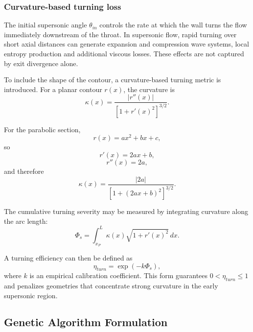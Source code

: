 \documentclass[journal,article,submit,oneauthor]{Definitions/mdpi}
\begin{document}
\subsubsection{Curvature-based turning loss}

The initial supersonic angle $\theta_{in}$ controls the rate at which the wall turns the flow immediately downstream of the throat. In supersonic flow, rapid turning over short axial distances can generate expansion and compression wave systems, local entropy production and additional viscous losses. These effects are not captured by exit divergence alone.

To include the shape of the contour, a curvature-based turning metric is introduced. For a planar contour $r(x)$, the curvature is
\begin{equation}
\kappa(x)=\frac{|r''(x)|}{\left[1+r'(x)^2\right]^{3/2}}.
\label{eq:curvature_general}
\end{equation}

For the parabolic section,
\begin{equation}
r(x)=ax^2+bx+c,
\end{equation}
so
\begin{equation}
r'(x)=2ax+b,
\end{equation}
\begin{equation}
r''(x)=2a,
\end{equation}
and therefore
\begin{equation}
\kappa(x)=\frac{|2a|}{\left[1+(2ax+b)^2\right]^{3/2}}.
\label{eq:curvature_parabola}
\end{equation}

The cumulative turning severity may be measured by integrating curvature along the arc length:
\begin{equation}
\Phi_s=\int_{x_P}^{L}\kappa(x)\sqrt{1+r'(x)^2}\,dx.
\label{eq:Phi_s}
\end{equation}

A turning efficiency can then be defined as
\begin{equation}
\boxed{\eta_{turn}=\exp(-k\Phi_s)},
\label{eq:eta_turn}
\end{equation}
where $k$ is an empirical calibration coefficient. This form guarantees $0<\eta_{turn}\leq1$ and penalizes geometries that concentrate strong curvature in the early supersonic region.

\subsection{Genetic Algorithm Formulation}
\end{document}
